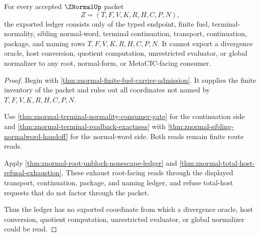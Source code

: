 \begin{theorem}
\label{thm:znormal-no-divergence-oracle-ledger}
For every accepted $\ZNormalUp$ packet
$$
Z=(T,F,V,K,R,H,C,P,N),
$$
the exported ledger consists only of the typed endpoint, finite fuel, terminal-normality, sibling normal-word, terminal continuation, transport, continuation, package, and naming rows $T,F,V,K,R,H,C,P,N$. It cannot export a divergence oracle, host conversion, quotient computation, unrestricted evaluator, or global normalizer to any root, normal-form, or MetaCIC-facing consumer.
\end{theorem}
\begin{proof}
Begin with \autoref{thm:znormal-finite-fuel-carrier-admission}. It supplies the finite inventory of the packet and rules out all coordinates not named by $T,F,V,K,R,H,C,P,N$.

Use \autoref{thm:znormal-terminal-normality-consumer-gate} for the continuation side and \autoref{thm:znormal-terminal-readback-exactness} with \autoref{thm:znormal-sibling-normalword-handoff} for the normal-word side. Both reads remain finite route reads.

Apply \autoref{thm:znormal-root-unblock-nonescape-ledger} and \autoref{thm:znormal-total-host-refusal-exhaustion}. These exhaust root-facing reads through the displayed transport, continuation, package, and naming ledger, and refuse total-host requests that do not factor through the packet.

Thus the ledger has no exported coordinate from which a divergence oracle, host conversion, quotient computation, unrestricted evaluator, or global normalizer could be read.
\end{proof}

